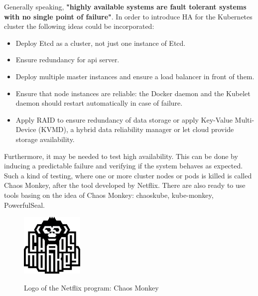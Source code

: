 Generally speaking, \textbf{"highly available systems are fault tolerant systems with no single point of failure"}\cite{article-redundancy-models}. In order to introduce HA for the Kubernetes cluster the following ideas could be incorporated\cite{book-mastering-k8s}:
\begin{itemize}
\item Deploy Etcd as a cluster, not just one instance of Etcd.
\item Ensure redundancy for api server.
\item Deploy multiple master instances and ensure a load balancer in front of them.
\item Ensure that node instances are reliable: the Docker daemon and the Kubelet daemon should restart automatically in case of failure.
\item Apply RAID to ensure redundancy of data storage or apply Key-Value Multi-Device (KVMD), a hybrid data reliability manager\cite{data-rel-kv} or let cloud provide storage availability.
\end{itemize}

Furthermore, it may be needed to test high availability. This can be done by inducing a predictable failure and verifying if the system behaves as expected\cite{book-mastering-k8s}. Such a kind of testing, where one or more cluster nodes or pods is killed is called Chaos Monkey, after the tool developed by Netflix. There are also ready to use tools basing on the idea of Chaos Monkey: chaoskube, kube-monkey, PowerfulSeal\cite{book-cndwk}.
\begin{figure}[H]
    \centering
    \includegraphics[width=3cm]{figures/chaos-monkey-logo.png}
    \label{fig:chaos-monkey-logo}
    \caption{Logo of the Netflix program: Chaos Monkey\cite{chaosmonkey}}
\end{figure}

